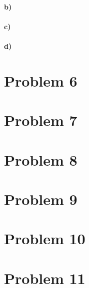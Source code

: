 \documentclass[12pt]{article}
\begin{document}
\paragraph{b)}

\paragraph{c)}

\paragraph{d)}

\section*{Problem 6}

\section*{Problem 7}

\section*{Problem 8}

\section*{Problem 9}

\section*{Problem 10}

\section*{Problem 11}
\end{document}
